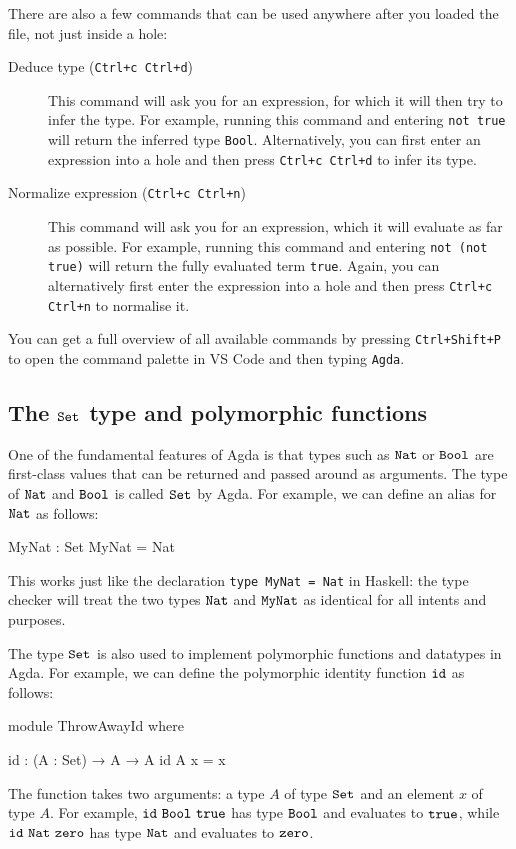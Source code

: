 \documentclass[a4paper,UKenglish]{tufte-handout}
\theoremstyle{definition}
\newcommand\prim[1]{{\AgdaPrimitive{#1}}}
\newcommand\ty[1]{{{\prim{Set}}_{#1}}}
\newcommand\fun[1]{{\AgdaFunction{#1}}}
\newcommand\data[1]{{\AgdaFunction{#1}}}
\newcommand\con[1]{{\AgdaInductiveConstructor{#1}}}
\newcommand\Nat{\data{Nat}}
\newcommand\zero{\con{zero}}
\newcommand\Bool{\data{Bool}}
\newcommand\true{\con{true}}
\begin{document}
There are also a few commands that can be used anywhere after you
loaded the file, not just inside a hole:

\begin{description}
\item[Deduce type (\texttt{Ctrl+c Ctrl+d})] This command will ask you
  for an expression, for which it will then try to infer the type. For
  example, running this command and entering \texttt{not true} will
  return the inferred type \texttt{Bool}. Alternatively, you
  can first enter an expression into a hole and then press
  \texttt{Ctrl+c Ctrl+d} to infer its type.  
\item[Normalize expression (\texttt{Ctrl+c Ctrl+n})] This command will ask you
  for an expression, which it will evaluate as far as possible. For
  example, running this command and entering \texttt{not (not true)} will
  return the fully evaluated term \texttt{true}. Again, you can
  alternatively first enter the expression into a hole and then
  press \texttt{Ctrl+c Ctrl+n} to normalise it.
\end{description}

You can get a full overview of all available commands by pressing
\texttt{Ctrl+Shift+P} to open the command palette in VS Code and then typing
\texttt{Agda}.


\subsection{The $\ty{}$ type and polymorphic functions}

One of the fundamental features of Agda is that types such as
$\data{Nat}$ or $\data{Bool}$ are first-class values that can be
returned and passed around as arguments. The type of $\data{Nat}$ and
$\data{Bool}$ is called $\ty{}$ by Agda. For example, we can define an
alias for $\data{Nat}$ as follows:
\begin{code}[number]
MyNat : Set
MyNat = Nat
\end{code}
This works just like the declaration \texttt{type MyNat = Nat} in
Haskell: the type checker will treat the two types $\data{Nat}$ and
$\fun{MyNat}$ as identical for all intents and purposes.


The type $\ty{}$ is also used to implement polymorphic functions and
datatypes in Agda. For example, we can define the polymorphic identity
function $\fun{id}$ as follows:
\begin{code}[hide]
module ThrowAwayId where
\end{code}
\begin{code}[number]
  id : (A : Set) → A → A
  id A x = x
\end{code}
The function \fun{id} takes two arguments: a type $A$ of type $\ty{}$
and an element $x$ of type $A$. For example, $\fun{id}\ \Bool\ \true$
has type $\Bool$ and evaluates to $\true$, while
$\fun{id}\ \Nat\ \zero$ has type $\Nat$ and evaluates to $\zero$.
\end{document}
